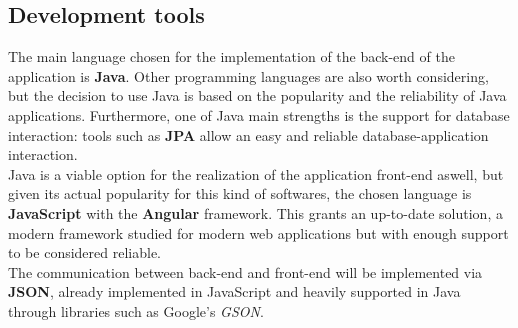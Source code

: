 \documentclass[10pt]{article} %
\begin{document}
\subsection{Development tools}
The main language chosen for the implementation of the back-end of the application is \textbf{Java}. Other programming languages are also worth considering,
but the decision to use Java is based on the popularity and the reliability of Java applications. Furthermore, one of Java main strengths is the support for
database interaction: tools such as \textbf{JPA} allow an easy and reliable database-application interaction.\\
Java is a viable option for the realization of the application front-end aswell, but given its actual popularity for this kind of softwares, the chosen language
is \textbf{JavaScript} with the \textbf{Angular} framework. This grants an up-to-date solution, a modern framework studied for modern web applications but with enough
support to be considered reliable.\\
The communication between back-end and front-end will be implemented via \textbf{JSON}, already implemented in JavaScript and heavily supported in Java through libraries
such as Google's \textit{GSON}.  
\end{document}

